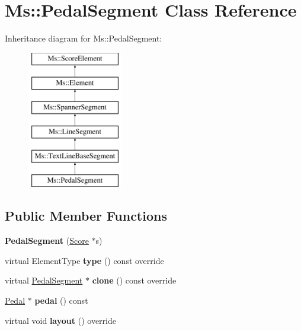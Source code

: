 \hypertarget{class_ms_1_1_pedal_segment}{}\section{Ms\+:\+:Pedal\+Segment Class Reference}
\label{class_ms_1_1_pedal_segment}
Inheritance diagram for Ms\+:\+:Pedal\+Segment\+:\begin{figure}[H]
\begin{center}
\leavevmode
\includegraphics[height=6.000000cm]{class_ms_1_1_pedal_segment}
\end{center}
\end{figure}
\subsection*{Public Member Functions}
\begin{DoxyCompactItemize}
\item 
\mbox{\label{class_ms_1_1_pedal_segment_ac5550ffb0604d9c425b9abe057348c75}} 
{\bfseries Pedal\+Segment} (\hyperlink{class_ms_1_1_score}{Score} $\ast$s)
\item 
\mbox{\label{class_ms_1_1_pedal_segment_a95600bd62b89000ad7b28da960bf6a42}} 
virtual Element\+Type {\bfseries type} () const override
\item 
\mbox{\label{class_ms_1_1_pedal_segment_ab8740bb4d00c6c8ce6bf15f326d8c667}} 
virtual \hyperlink{class_ms_1_1_pedal_segment}{Pedal\+Segment} $\ast$ {\bfseries clone} () const override
\item 
\mbox{\label{class_ms_1_1_pedal_segment_a7f4637c876d74f9680e53880c94c32f6}} 
\hyperlink{class_ms_1_1_pedal}{Pedal} $\ast$ {\bfseries pedal} () const
\item 
\mbox{\label{class_ms_1_1_pedal_segment_abfa9a6f7e5472c11eedfc558ad8a0dad}} 
virtual void {\bfseries layout} () override
\end{DoxyCompactItemize}

